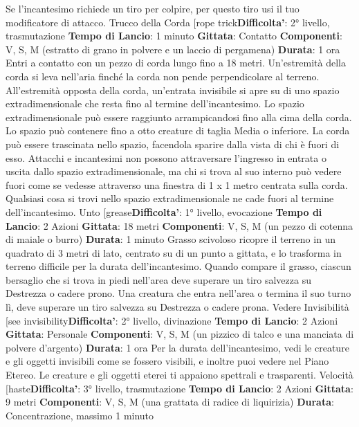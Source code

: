 \begin{multicols}{2}
Se l’incantesimo richiede un tiro per colpire, per questo
tiro usi il tuo modificatore di attacco.
Trucco della Corda
[rope trick\textbf{Difficolta'}:
2° livello, trasmutazione
\textbf{Tempo di Lancio}: 1 minuto
\textbf{Gittata}: Contatto
\textbf{Componenti}: V, S, M (estratto di grano in polvere e un
laccio di pergamena)
\textbf{Durata}: 1 ora
Entri a contatto con un pezzo di corda lungo fino a 18
metri. Un’estremità della corda si leva nell’aria finché la
corda non pende perpendicolare al terreno.
All’estremità opposta della corda, un’entrata invisibile si
apre su di uno spazio extradimensionale che resta fino
al termine dell’incantesimo.
Lo spazio extradimensionale può essere raggiunto
arrampicandosi fino alla cima della corda. Lo spazio
può contenere fino a otto creature di taglia Media o
inferiore. La corda può essere trascinata nello spazio,
facendola sparire dalla vista di chi è fuori di esso.
Attacchi e incantesimi non possono attraversare
l’ingresso in entrata o uscita dallo spazio
extradimensionale, ma chi si trova al suo interno può
vedere fuori come se vedesse attraverso una finestra di
1 x 1 metro centrata sulla corda.
Qualsiasi cosa si trovi nello spazio extradimensionale
ne cade fuori al termine dell’incantesimo.
Unto
[grease\textbf{Difficolta'}:
1° livello, evocazione
\textbf{Tempo di Lancio}: 2 Azioni
\textbf{Gittata}: 18 metri
\textbf{Componenti}: V, S, M (un pezzo di cotenna di maiale o
burro)
\textbf{Durata}: 1 minuto
Grasso scivoloso ricopre il terreno in un quadrato di 3
metri di lato, centrato su di un punto a gittata, e lo
trasforma in terreno difficile per la durata
dell’incantesimo.
Quando compare il grasso, ciascun bersaglio che si
trova in piedi nell’area deve superare un tiro salvezza
su Destrezza o cadere prono. Una creatura che entra
nell’area o termina il suo turno lì, deve superare un tiro
salvezza su Destrezza o cadere prona.
Vedere Invisibilità
[see invisibility\textbf{Difficolta'}:
2° livello, divinazione
\textbf{Tempo di Lancio}: 2 Azioni
\textbf{Gittata}: Personale
\textbf{Componenti}: V, S, M (un pizzico di talco e una
manciata di polvere d’argento)
\textbf{Durata}: 1 ora
Per la durata dell’incantesimo, vedi le creature e gli
oggetti invisibili come se fossero visibili, e inoltre puoi
vedere nel Piano Etereo. Le creature e gli oggetti eterei
ti appaiono spettrali e trasparenti.
Velocità
[haste\textbf{Difficolta'}:
3° livello, trasmutazione
\textbf{Tempo di Lancio}: 2 Azioni
\textbf{Gittata}: 9 metri
\textbf{Componenti}: V, S, M (una grattata di radice di
liquirizia)
\textbf{Durata}: Concentrazione, massimo 1 minuto

\end{multicols}

